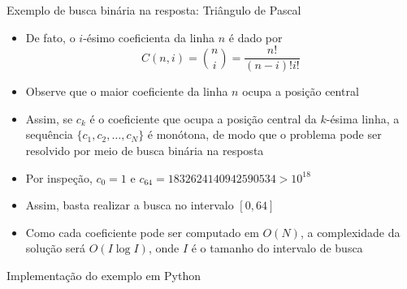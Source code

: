 \begin{frame}[fragile]{Exemplo de busca binária na resposta: Triângulo de Pascal}

    \begin{itemize}
        \item De fato, o $i$-ésimo coeficienta da linha $n$ é dado por
        $$
            C(n, i) = \binom{n}{i} = \frac{n!}{(n - i)!i!}
        $$

        \item Observe que o maior coeficiente da linha $n$ ocupa a posição central

        \item Assim, se $c_k$ é o coeficiente que ocupa a posição central da $k$-ésima linha, 
            a sequência $\{ c_1, c_2, \ldots, c_N\}$ é monótona, de modo que o problema pode ser
            resolvido por meio de busca binária na resposta

        \item Por inspeção, $c_0 = 1$ e $c_{64} = 1832624140942590534 > 10^{18}$

        \item Assim, basta realizar a busca no intervalo $[0, 64]$

        \item Como cada coeficiente pode ser computado em $O(N)$, a complexidade da solução será
            $O(I\log I)$, onde $I$ é o tamanho do intervalo de busca
    \end{itemize}

\end{frame}

\begin{frame}[fragile]{Implementação do exemplo em Python}
\end{frame}
